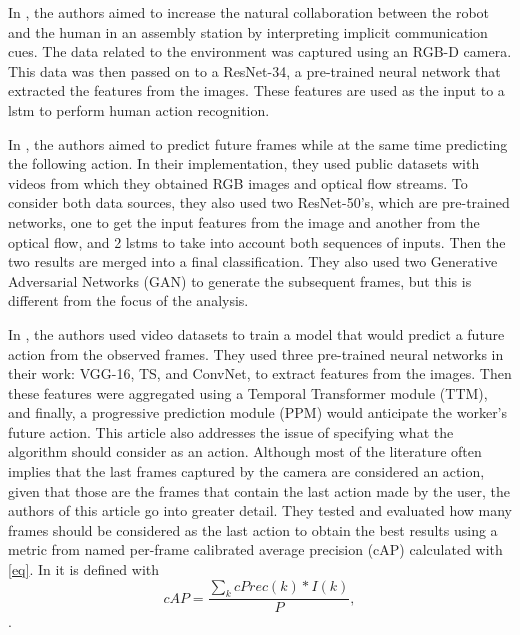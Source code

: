 In \textcite{Moutinho2023}, the authors aimed to increase the natural collaboration between the robot and the human in an assembly station by interpreting implicit communication cues. The data related to the environment was captured using an RGB-D camera. This data was then passed on to a ResNet-34, a pre-trained neural network that extracted the features from the images. These features are used as the input to a \acs{lstm} to perform human action recognition.

In \textcite{Gammulle2019}, the authors aimed to predict future frames while at the same time predicting the following action. In their implementation, they used public datasets with videos from which they obtained RGB images and optical flow streams. To consider both data sources, they also used two ResNet-50's, which are pre-trained networks, one to get the input features from the image and another from the optical flow, and 2 \acp{lstm} to take into account both sequences of inputs. Then the two results are merged into a final classification. They also used two Generative Adversarial Networks (GAN) to generate the subsequent frames, but this is different from the focus of the analysis.

In \textcite{Wang2021}, the authors used video datasets to train a model that would predict a future action from the observed frames. They used three pre-trained neural networks in their work: VGG-16, TS, and ConvNet, to extract features from the images. Then these features were aggregated using a Temporal Transformer module (TTM), and finally, a progressive prediction module (PPM) would anticipate the worker's future action. This article also addresses the issue of specifying what the algorithm should consider as an action. Although most of the literature often implies that the last frames captured by the camera are considered an action, given that those are the frames that contain the last action made by the user, the authors of this article go into greater detail. They tested and evaluated how many frames should be considered as the last action to obtain the best results using a metric from \textcite{Geest2016} named per-frame calibrated average precision (cAP) calculated with \eqref{eq}. In \cite{Wang2021} it is defined with
\begin{equation}
cAP=\frac{\sum_k cPrec(k) * I(k)}{P},
\label{eq}
\end{equation}
.


